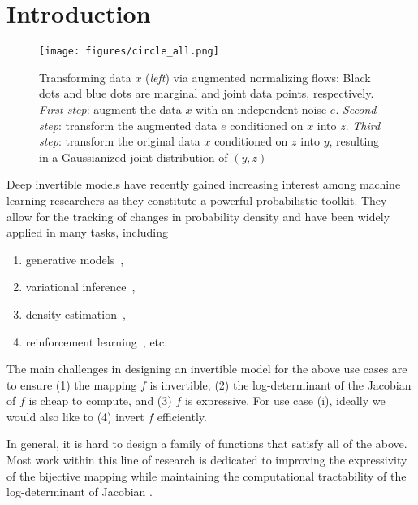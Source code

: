 \documentclass{article}
\begin{document}
\section{Introduction}
\begin{figure*}
    \centering
    \texttt{[image: figures/circle\_all.png]}
    \vspace{-0.7cm}
    \caption{\small 
    Transforming data $x$ (\emph{left}) via augmented normalizing flows:
    Black dots and blue dots are marginal and joint data points, respectively.
    \emph{First step}: augment the data $x$ with an independent noise $e$.
    \emph{Second step}: transform the augmented data $e$ conditioned on $x$ into $z$. 
    \emph{Third step}: transform the original data $x$ conditioned on $z$ into $y$, resulting in a Gaussianized joint distribution of $(y,z)$}
    \label{fig:2d_vis}
\end{figure*}
Deep invertible models have recently gained increasing interest among machine learning researchers as they constitute a powerful probabilistic toolkit. 
They allow for the tracking of  changes in probability density and have been widely applied in many tasks, including
\begin{enumerate}[label=(\roman*)]
    \item generative models~\citep{dinh2016density, kingma2018glow, chen2019residualflows},
    \item variational inference~\citep{rezende2015variational,kingma2016improved,berg2018sylvester},
    \item density estimation~\citep{papamakarios2017masked,huang2018neural},
    \item reinforcement learning~\citep{mazoure2019leveraging,ward2019improving}, etc. 
\end{enumerate} 

The main challenges in designing an invertible model for the above use cases are
to ensure (1) the mapping $f$ is invertible, (2) the log-determinant of the Jacobian of $f$ is cheap to compute, and (3) $f$ is expressive. 
For use case (i), ideally we would also like to (4) invert $f$ efficiently. 

In general, it is hard to design a family of functions that satisfy all of the above. 
Most work within this line of research is dedicated to improving the expressivity of the bijective mapping while maintaining the computational tractability of the log-determinant of Jacobian \citep{dinh2016density, kingma2016improved, huang2018neural, chen2019residualflows}. 
\end{document}
